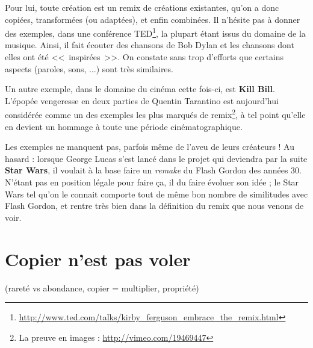 
Pour lui, toute création est un remix de créations existantes, qu'on a donc copiées, transformées (ou adaptées), et enfin combinées.
Il n'hésite pas à donner des exemples, dans une conférence TED\footnote{\url{http://www.ted.com/talks/kirby_ferguson_embrace_the_remix.html}}, la plupart étant issus du domaine de la musique.
Ainsi, il fait écouter des chansons de Bob Dylan et les chansons dont elles ont été <<~inspirées~>>.
On constate sans trop d'efforts que certains aspects (paroles, sons, ...) sont très similaires.

Un autre exemple, dans le domaine du cinéma cette fois-ci, est \textbf{Kill Bill}.
L'épopée vengeresse en deux parties de Quentin Tarantino est aujourd'hui considérée comme un des exemples les plus marqués de remix\footnote{La preuve en images : \url{http://vimeo.com/19469447}}, à tel point qu'elle en devient un hommage à toute une période cinématographique.

Les exemples ne manquent pas, parfois même de l'aveu de leurs créateurs !
Au hasard : lorsque George Lucas s'est lancé dans le projet qui deviendra par la suite \textbf{Star Wars}, il voulait à la base faire un \textit{remake} du Flash Gordon des années 30.
N'étant pas en position légale pour faire ça, il du faire évoluer son idée ; le Star Wars tel qu'on le connait comporte tout de même bon nombre de similitudes avec Flash Gordon, et rentre très bien dans la définition du remix que nous venons de voir.



\section{Copier n'est pas voler}

(rareté vs abondance, copier = multiplier, propriété)
